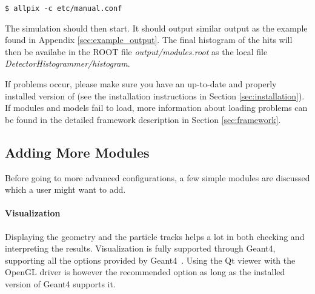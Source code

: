\begin{verbatim}
$ allpix -c etc/manual.conf
\end{verbatim}
The simulation should then start. It should output similar output as the example found in Appendix \ref{sec:example_output}. The final histogram of the hits will then be availabe in the ROOT file \textit{output/modules.root} as the local file \textit{DetectorHistogrammer/histogram}.

If problems occur, please make sure you have an up-to-date and properly installed version of \apsq (see the installation instructions in Section \ref{sec:installation}). If modules and models fail to load, more information about loading problems can be found in the detailed framework description in Section \ref{sec:framework}.

\subsection{Adding More Modules}
Before going to more advanced configurations, a few simple modules are discussed which a user might want to add.

\paragraph{Visualization}
Displaying the geometry and the particle tracks helps a lot in both checking and interpreting the results. Visualization is fully supported through Geant4, supporting all the options provided by Geant4~\cite{geant4vis}. Using the Qt viewer with the OpenGL driver is however the recommended option as long as the installed version of Geant4 supports it.

